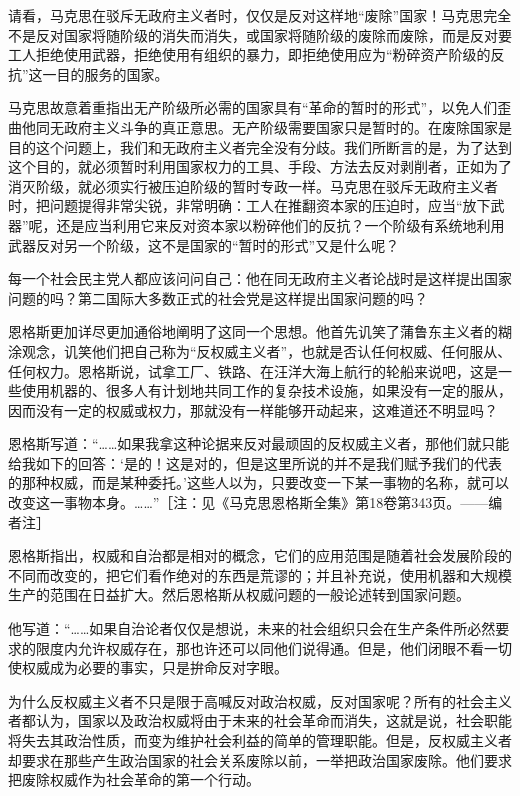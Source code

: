 \documentclass[UTF8, 12pt, a4paper]{ctexrep}
\begin{document}
请看，马克思在驳斥无政府主义者时，仅仅是反对这样地“废除”国家！马克思完全不是反对国家将随阶级的消失而消失，或国家将随阶级的废除而废除，而是反对要工人拒绝使用武器，拒绝使用有组织的暴力，即拒绝使用应为“粉碎资产阶级的反抗”这一目的服务的国家。

马克思故意着重指出无产阶级所必需的国家具有“革命的暂时的形式”，以免人们歪曲他同无政府主义斗争的真正意思。无产阶级需要国家只是暂时的。在废除国家是目的这个问题上，我们和无政府主义者完全没有分歧。我们所断言的是，为了达到这个目的，就必须暂时利用国家权力的工具、手段、方法去反对剥削者，正如为了消灭阶级，就必须实行被压迫阶级的暂时专政一样。马克思在驳斥无政府主义者时，把问题提得非常尖锐，非常明确：工人在推翻资本家的压迫时，应当“放下武器”呢，还是应当利用它来反对资本家以粉碎他们的反抗？一个阶级有系统地利用武器反对另一个阶级，这不是国家的“暂时的形式”又是什么呢？

每一个社会民主党人都应该问问自己：他在同无政府主义者论战时是这样提出国家问题的吗？第二国际大多数正式的社会党是这样提出国家问题的吗？

恩格斯更加详尽更加通俗地阐明了这同一个思想。他首先讥笑了蒲鲁东主义者的糊涂观念，讥笑他们把自己称为“反权威主义者”，也就是否认任何权威、任何服从、任何权力。恩格斯说，试拿工厂、铁路、在汪洋大海上航行的轮船来说吧，这是一些使用机器的、很多人有计划地共同工作的复杂技术设施，如果没有一定的服从，因而没有一定的权威或权力，那就没有一样能够开动起来，这难道还不明显吗？

恩格斯写道：“……如果我拿这种论据来反对最顽固的反权威主义者，那他们就只能给我如下的回答：‘是的！这是对的，但是这里所说的并不是我们赋予我们的代表的那种权威，而是某种委托。’这些人以为，只要改变一下某一事物的名称，就可以改变这一事物本身。……”［注：见《马克思恩格斯全集》第18卷第343页。——编者注］

恩格斯指出，权威和自治都是相对的概念，它们的应用范围是随着社会发展阶段的不同而改变的，把它们看作绝对的东西是荒谬的；并且补充说，使用机器和大规模生产的范围在日益扩大。然后恩格斯从权威问题的一般论述转到国家问题。

他写道：“……如果自治论者仅仅是想说，未来的社会组织只会在生产条件所必然要求的限度内允许权威存在，那也许还可以同他们说得通。但是，他们闭眼不看一切使权威成为必要的事实，只是拚命反对字眼。

为什么反权威主义者不只是限于高喊反对政治权威，反对国家呢？所有的社会主义者都认为，国家以及政治权威将由于未来的社会革命而消失，这就是说，社会职能将失去其政治性质，而变为维护社会利益的简单的管理职能。但是，反权威主义者却要求在那些产生政治国家的社会关系废除以前，一举把政治国家废除。他们要求把废除权威作为社会革命的第一个行动。
\end{document}

